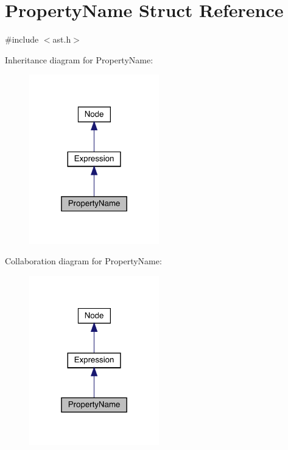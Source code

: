 \hypertarget{struct_property_name}{}\section{Property\+Name Struct Reference}
\label{struct_property_name}


{\ttfamily \#include $<$ast.\+h$>$}



Inheritance diagram for Property\+Name\+:
\nopagebreak
\begin{figure}[H]
\begin{center}
\leavevmode
\includegraphics[width=160pt]{struct_property_name__inherit__graph}
\end{center}
\end{figure}


Collaboration diagram for Property\+Name\+:
\nopagebreak
\begin{figure}[H]
\begin{center}
\leavevmode
\includegraphics[width=160pt]{struct_property_name__coll__graph}
\end{center}
\end{figure}

